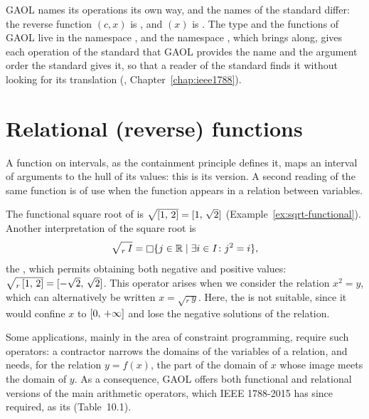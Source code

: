 \medskip
\noindent GAOL names its operations its own way, and the names of the
standard differ: the reverse function $(c, x)$ is
, and $(x)$ is
. The type  and the functions
of GAOL live in the namespace , and the namespace
, which  brings along, gives each
operation of the standard that GAOL provides the name and the argument
order the standard gives it, so that a reader of the standard finds it
without looking for its translation (,
Chapter~\ref{chap:ieee1788}).\newinvfive
{}%

\section{Relational (reverse) functions}\label{sec:relational-idea}
%
%

A function on intervals, as the containment principle defines it, maps an
interval of arguments to the hull of its values: this is its
 version. A second reading of the same function is of use
when the function appears in a relation between variables.

\begin{Ex}\label{ex:sqrt-relational}
The functional square root of  is
$\sqrt{[1,\,2]}=[1,\,\sqrt{2}]$ (Example~\ref{ex:sqrt-functional}).
Another interpretation of the square root is
\begin{equation*}
  \sqrt{_r\,I}=\mathop{\Box} \{j\in\mathbb{R}\mid\exists i\in I\colon j^2=i\},
\end{equation*}
the , which permits obtaining both negative and
positive values: $\sqrt{_r\,[1,\,2]}=[-\sqrt{2},\,\sqrt{2}]$. This
operator arises when we consider the relation $x^2=y$, which can
alternatively be written $x=\sqrt{_r\,y}$. Here, the  is not suitable, since it would confine $x$ to $[0,\,+\infty]$ and
lose the negative solutions of the relation.
\end{Ex}

Some applications, mainly in the area of constraint programming, require
such operators: a contractor narrows the domains of the variables of a
relation, and needs, for the relation $y=f(x)$, the part of the domain of
$x$ whose image meets the domain of $y$. As a consequence, GAOL offers both
functional and relational versions of the main arithmetic operators, which
IEEE 1788-2015 has since required, as its 
(Table~10.1).

